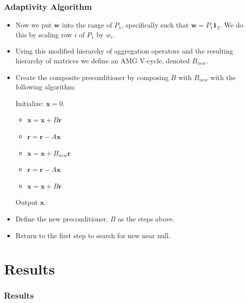 \documentclass[xcolor=dvipsnames]{beamer}
\newcommand{\vc}{\boldsymbol}
\begin{document}
\begin{frame}
  \frametitle{Adaptivity Algorithm}
  \begin{itemize}
    \item Now we put $\vc w$ into the range of $P_1$,
      specifically such that $\vc w = P_1 \vc 1_2$. We
      do this by scaling row $i$ of $P_1$ by $w_i$.

    \item Using this modified hierarchy of aggregation operators
      and the resulting hierarchy of matrices we define an
      AMG V-cycle, denoted $B_{new}$.
    \item Create the composite preconditioner by composing
      $B$ with $B_{new}$ with the following algorithm:

      Initialize: $\vc x = 0$.
      \begin{itemize}
        \item $\vc x = \vc x + B \vc r$
        \item $\vc r = \vc r - A \vc x$
        \item $\vc x = \vc x + B_{new} \vc r$
        \item $\vc r = \vc r - A \vc x$
        \item $\vc x = \vc x + B \vc r$
      \end{itemize}
      Output $\vc x$.
    \item Define the new preconditioner, $B$ as the steps above.
    \item Return to the first step to search for new near null.
  \end{itemize}

\end{frame}

\section{Results}
\begin{frame}
  \frametitle{Results}
\end{frame}
\end{document}

